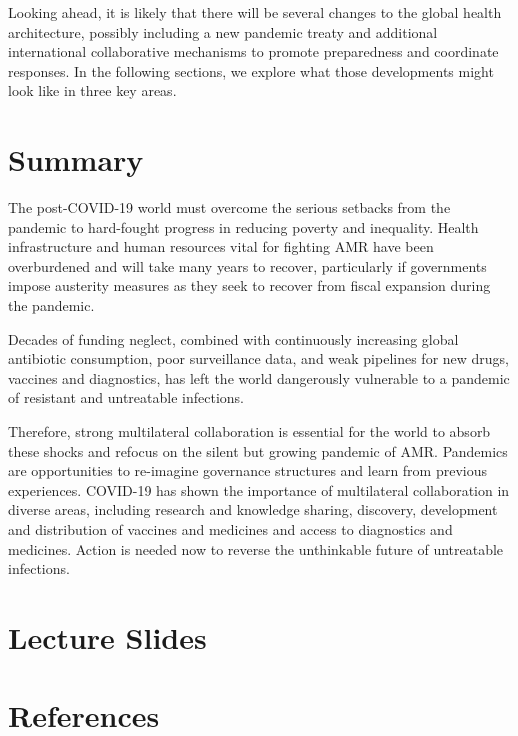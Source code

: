 \documentclass[
]{book}
\begin{document}
Looking ahead, it is likely that there will be several changes to the global health architecture, possibly including a new pandemic treaty and additional international collaborative mechanisms to promote preparedness and coordinate responses. In the following sections, we explore what those developments might look like in three key areas.

\hypertarget{summary}{%
\section*{Summary}\label{summary}}

The post-COVID-19 world must overcome the serious setbacks from the pandemic to hard-fought progress in reducing poverty and inequality. Health infrastructure and human resources vital for fighting AMR have been overburdened and will take many years to recover, particularly if governments impose austerity measures as they seek to recover from fiscal expansion during the pandemic.

Decades of funding neglect, combined with continuously increasing global antibiotic consumption, poor surveillance data, and weak pipelines for new drugs, vaccines and diagnostics, has left the world dangerously vulnerable to a pandemic of resistant and untreatable infections.

Therefore, strong multilateral collaboration is essential for the world to absorb these shocks and refocus on the silent but growing pandemic of AMR. Pandemics are opportunities to re-imagine governance structures and learn from previous experiences. COVID-19 has shown the importance of multilateral collaboration in diverse areas, including research and knowledge sharing, discovery, development and distribution of vaccines and medicines and access to diagnostics and medicines. Action is needed now to reverse the unthinkable future of untreatable infections.

\hypertarget{lecture-slides}{%
\section*{Lecture Slides}\label{lecture-slides}}

\hypertarget{references}{%
\section*{References}\label{references}}
\end{document}
